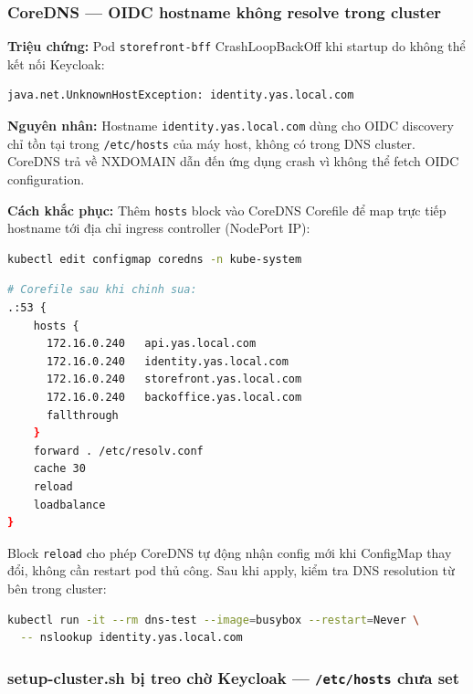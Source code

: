 \subsubsection{CoreDNS — OIDC hostname không resolve trong cluster}

\textbf{Triệu chứng:} Pod \texttt{storefront-bff} CrashLoopBackOff khi startup do không thể kết nối Keycloak:

\begin{lstlisting}[language=bash]
java.net.UnknownHostException: identity.yas.local.com
\end{lstlisting}

\textbf{Nguyên nhân:} Hostname \texttt{identity.yas.local.com} dùng cho OIDC discovery chỉ tồn tại trong \texttt{/etc/hosts} của máy host, không có trong DNS cluster. CoreDNS trả về NXDOMAIN dẫn đến ứng dụng crash vì không thể fetch OIDC configuration.

\textbf{Cách khắc phục:} Thêm \texttt{hosts} block vào CoreDNS Corefile để map trực tiếp hostname tới địa chỉ ingress controller (NodePort IP):

\begin{lstlisting}[language=bash]
kubectl edit configmap coredns -n kube-system
\end{lstlisting}

\begin{lstlisting}[language=bash]
# Corefile sau khi chinh sua:
.:53 {
    hosts {
      172.16.0.240   api.yas.local.com
      172.16.0.240   identity.yas.local.com
      172.16.0.240   storefront.yas.local.com
      172.16.0.240   backoffice.yas.local.com
      fallthrough
    }
    forward . /etc/resolv.conf
    cache 30
    reload
    loadbalance
}
\end{lstlisting}

Block \texttt{reload} cho phép CoreDNS tự động nhận config mới khi ConfigMap thay đổi, không cần restart pod thủ công. Sau khi apply, kiểm tra DNS resolution từ bên trong cluster:

\begin{lstlisting}[language=bash]
kubectl run -it --rm dns-test --image=busybox --restart=Never \
  -- nslookup identity.yas.local.com
\end{lstlisting}

\subsubsection{setup-cluster.sh bị treo chờ Keycloak — \texttt{/etc/hosts} chưa set}

